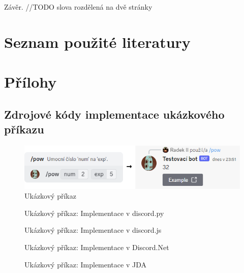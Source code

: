 \documentclass[FM]{tulthesis}
\begin{document}
	Závěr. //TODO slova rozdělená na dvě stránky%
	
	\chapter*{Seznam použité literatury}
	\printbibliography[heading=none]
	
	\appendix
	\chapter{Přílohy}
	
	\section{Zdrojové kódy implementace ukázkového příkazu}
	
	\begin{figure}[ht]
		\centering
		\includegraphics[width=\textwidth]{img/ExampleCommand}
		\caption{Ukázkový příkaz}
		\label{_tag_img_pow}
	\end{figure}
	
	\begin{figure}[ht]
		
		\caption{Ukázkový příkaz: Implementace v discord.py}
	\end{figure}
	
	\begin{figure}[ht]
		
		\caption{Ukázkový příkaz: Implementace v discord.js}
	\end{figure}
	
	\begin{figure}[ht]
		
		\caption{Ukázkový příkaz: Implementace v Discord.Net}
	\end{figure}
	
	\begin{figure}[ht]
		
		\caption{Ukázkový příkaz: Implementace v JDA}
	\end{figure}
	
\end{document}
